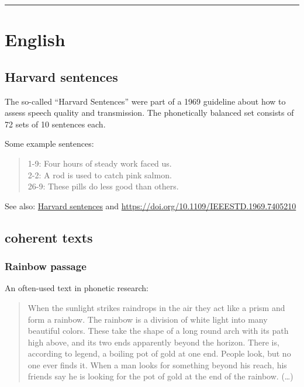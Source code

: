 \documentclass[
]{book}
\begin{document}
\begin{center}\rule{0.5\linewidth}{0.5pt}\end{center}

\section{English}\label{english}

\subsection{Harvard sentences}\label{harvard-sentences}

The so-called ``Harvard Sentences'' were part of a 1969 guideline about how to assess speech quality and transmission. The phonetically balanced set consists of 72 sets of 10 sentences each.

Some example sentences:

\begin{quote}
1-9: Four hours of steady work faced us.\\
2-2: A rod is used to catch pink salmon.\\
26-9: These pills do less good than others.
\end{quote}

See also: \href{https://en.wikipedia.org/wiki/Harvard_sentences}{Harvard sentences} and \url{https://doi.org/10.1109/IEEESTD.1969.7405210}

\subsection{coherent texts}\label{coherent-texts-1}

\subsubsection{Rainbow passage}\label{rainbow-passage}

An often-used text in phonetic research:

\begin{quote}
When the sunlight strikes raindrops in the air they act like a prism and form a rainbow.
The rainbow is a division of white light into many beautiful colors.
These take the shape of a long round arch with its path high above, and its two ends apparently beyond the horizon.
There is, according to legend, a boiling pot of gold at one end.
People look, but no one ever finds it.
When a man looks for something beyond his reach, his friends say he is looking for the pot of gold at the end of the rainbow. (\ldots)
\end{quote}
\end{document}
